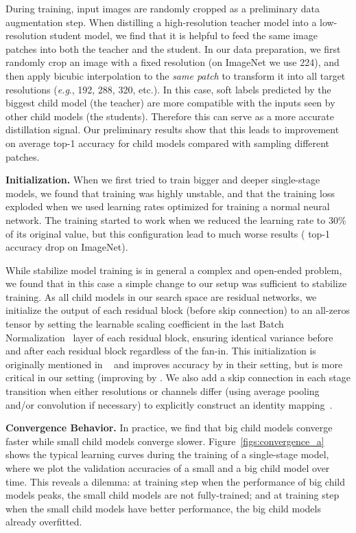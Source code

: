 \documentclass[runningheads]{llncs}
\def\onedot{.}
\def\eg{\emph{e.g}\onedot} \def\Eg{\emph{E.g}\onedot}
\begin{document}
During training, input images are randomly cropped as a preliminary data augmentation step. When distilling a high-resolution teacher model into a low-resolution student model, we find that it is helpful to feed the same image patches into both the teacher and the student. In our data preparation, we first randomly crop an image with a fixed resolution (on ImageNet we use 224), and then apply bicubic interpolation to the \emph{same patch} to transform it into all target resolutions (\eg, 192, 288, 320, etc.). In this case, soft labels predicted by the biggest child model (the teacher) are more compatible with the inputs seen by other child models (the students). Therefore this can serve as a more accurate distillation signal. Our preliminary results show that this leads to  improvement on average top-1 accuracy for child models compared with sampling different patches.

\textbf{Initialization.}
When we first tried to train bigger and deeper single-stage models, we found that training was highly unstable, and that the training loss exploded when we used learning rates optimized for training a normal neural network. The training started to work when we reduced the learning rate to 30\% of its original value, but this configuration lead to much worse results ( top-1 accuracy drop on ImageNet).

While stabilize model training is in general a complex and open-ended problem, we found that in this case a simple change to our setup was sufficient to stabilize training. As all child models in our search space are residual networks, we initialize the output of each residual block (before skip connection) to an all-zeros tensor by setting the learnable scaling coefficient  in the last Batch Normalization~\cite{ioffe2015batch} layer of each residual block, ensuring identical variance before and after each residual block regardless of the fan-in. This initialization is originally mentioned in ~\cite{goyal2017accurate} and improves accuracy by  in their setting, but is more critical in our setting (improving by . We also add a skip connection in each stage transition when either resolutions or channels differ (using  average pooling and/or  convolution if necessary) to explicitly construct an identity mapping~\cite{he2016identity}.

\textbf{Convergence Behavior.} In practice, we find that big child models converge faster while small child models converge slower. Figure~\ref{figs:convergence_a} shows the typical learning curves during the training of a single-stage model, where we plot the validation accuracies of a small and a big child model over time. This reveals a dilemma: at training step  when the performance of big child models peaks, the small child models are not fully-trained; and at training step  when the small child models have better performance, the big child models already overfitted.
\end{document}
